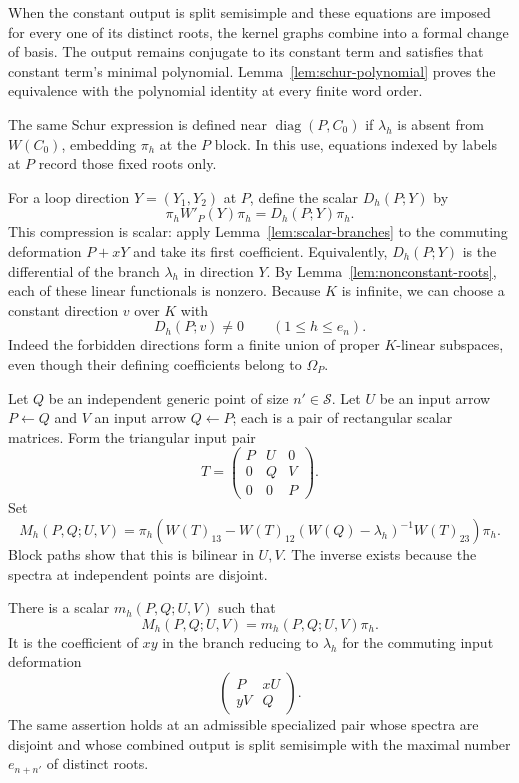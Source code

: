 When the constant output is split semisimple and these equations are
imposed for every one of its distinct roots, the kernel graphs combine
into a formal change of basis. The output remains conjugate to its
constant term and satisfies that constant term's minimal polynomial.
Lemma~\ref{lem:schur-polynomial} proves the equivalence with the
polynomial identity at every finite word order.

The same Schur expression is defined near $\operatorname{diag}(P,C_0)$
if $\lambda_h$ is absent from $W(C_0)$, embedding $\pi_h$ at the $P$
block. In this use, equations indexed by labels at $P$ record those
fixed roots only.

For a loop direction $Y=(Y_1,Y_2)$ at $P$, define the scalar
$D_h(P;Y)$ by
\begin{equation}
\pi_h W'_P(Y)\pi_h=D_h(P;Y)\pi_h.
 \label{eq:loop-response}
\end{equation}
This compression is scalar: apply Lemma~\ref{lem:scalar-branches}
to the commuting deformation $P+xY$ and take its first coefficient.
Equivalently, $D_h(P;Y)$ is the differential of the branch
$\lambda_h$ in direction $Y$.  By
Lemma~\ref{lem:nonconstant-roots}, each of these linear functionals is
nonzero.  Because $K$ is infinite, we can choose a constant direction
$v$ over $K$ with
\begin{equation}
D_h(P;v)\ne0\qquad(1\le h\le e_n).
 \label{eq:nonzero-direction}
\end{equation}
Indeed the forbidden directions form a finite union of proper
$K$-linear subspaces, even though their defining coefficients belong
to $\Omega_P$.

Let $Q$ be an independent generic point of size $n'\in\mathcal S$.
Let $U$ be an input arrow $P\leftarrow Q$ and $V$ an input arrow
$Q\leftarrow P$; each is a pair of rectangular scalar matrices.
Form the triangular input pair
\[
 T=\begin{pmatrix}P&U&0\\0&Q&V\\0&0&P\end{pmatrix}.
\]
Set
\begin{equation}
M_h(P,Q;U,V)=\pi_h\left(
 W(T)_{13}
 -W(T)_{12}(W(Q)-\lambda_h)^{-1}W(T)_{23}
 \right)\pi_h.
 \label{eq:paired-response}
\end{equation}
Block paths show that this is bilinear in $U,V$.  The inverse exists
because the spectra at independent points are disjoint.

\begin{lemma}\label{lem:paired-scalar}
There is a scalar $m_h(P,Q;U,V)$ such that
\[
 M_h(P,Q;U,V)=m_h(P,Q;U,V)\pi_h.
\]
It is the coefficient of $xy$ in the branch reducing to $\lambda_h$
for the commuting input deformation
\[
 \begin{pmatrix}P&xU\\yV&Q\end{pmatrix}.
\]
The same assertion holds at an admissible specialized pair whose
spectra are disjoint and whose combined output is split semisimple
with the maximal number $e_{n+n'}$ of distinct roots.
\end{lemma}


